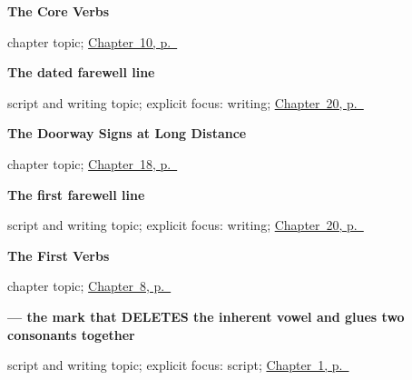 \noindent\begin{minipage}[t]{\linewidth}
\raggedright
\textbf{The Core Verbs}\par
\footnotesize chapter topic; \hyperref[ch:mr-core-verbs]{Chapter~10, p.~\pageref*{ch:mr-core-verbs}}
\end{minipage}\par\smallskip

\noindent\begin{minipage}[t]{\linewidth}
\raggedright
\textbf{The dated farewell line}\par
\footnotesize script and writing topic; explicit focus: writing; \hyperref[ch:mr-a1-named-reader-message]{Chapter~20, p.~\pageref*{ch:mr-a1-named-reader-message}}
\end{minipage}\par\smallskip

\noindent\begin{minipage}[t]{\linewidth}
\raggedright
\textbf{The Doorway Signs at Long Distance}\par
\footnotesize chapter topic; \hyperref[ch:doorway-script-distance]{Chapter~18, p.~\pageref*{ch:doorway-script-distance}}
\end{minipage}\par\smallskip

\noindent\begin{minipage}[t]{\linewidth}
\raggedright
\textbf{The first farewell line}\par
\footnotesize script and writing topic; explicit focus: writing; \hyperref[ch:mr-a1-named-reader-message]{Chapter~20, p.~\pageref*{ch:mr-a1-named-reader-message}}
\end{minipage}\par\smallskip

\noindent\begin{minipage}[t]{\linewidth}
\raggedright
\textbf{The First Verbs}\par
\footnotesize chapter topic; \hyperref[ch:first-verbs]{Chapter~8, p.~\pageref*{ch:first-verbs}}
\end{minipage}\par\smallskip

\noindent\begin{minipage}[t]{\linewidth}
\raggedright
\textbf{ — the mark that DELETES the inherent vowel and glues two consonants together}\par
\footnotesize script and writing topic; explicit focus: script; \hyperref[ch:first-greeting-script]{Chapter~1, p.~\pageref*{ch:first-greeting-script}}
\end{minipage}\par\smallskip

